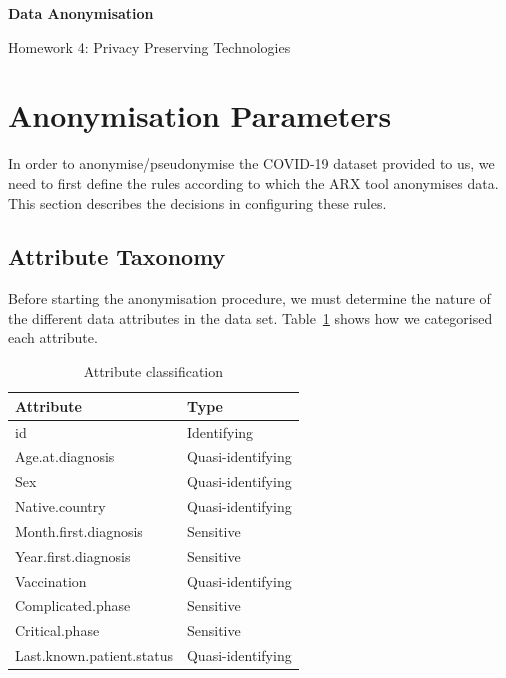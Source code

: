 \documentclass[parskip=half]{scrartcl}
\begin{document}


\begin{center}
    \Large
    \textsf{\textbf{Data Anonymisation}}
        
    \vspace{0.4cm}
    \large
    Homework 4: Privacy Preserving Technologies
        
    \vspace{0.4cm}
    \docauthor{}
       
    \vspace{0.9cm}
\end{center}

\tableofcontents

\section{Anonymisation Parameters}

In order to anonymise/pseudonymise the COVID-19 dataset provided to us, we need
to first define the rules according to which the ARX tool anonymises data. This
section describes the decisions in configuring these rules.

\subsection{Attribute Taxonomy}

Before starting the anonymisation procedure, we must determine the nature of
the different data attributes in the data set. Table~\ref{tab:attclass} shows
how we categorised each attribute.

\begin{table}
\begin{center}
    \begin{tabular}{ |l|l| } 
        \hline
        Attribute & Type\\
        \hline
        \hline
        id & Identifying\\
        \hline
        Age.at.diagnosis & Quasi-identifying\\
        \hline 
        Sex & Quasi-identifying\\
        \hline
        Native.country & Quasi-identifying\\
        \hline
        Month.first.diagnosis & Sensitive\\
        \hline
        Year.first.diagnosis & Sensitive\\
        \hline
        Vaccination & Quasi-identifying\\
        \hline
        Complicated.phase & Sensitive\\
        \hline
        Critical.phase & Sensitive\\
        \hline
        Last.known.patient.status & Quasi-identifying\\
        \hline
    \end{tabular}
    \caption{Attribute classification}
    \label{tab:attclass}
\end{center}
\end{table}
\end{document}
